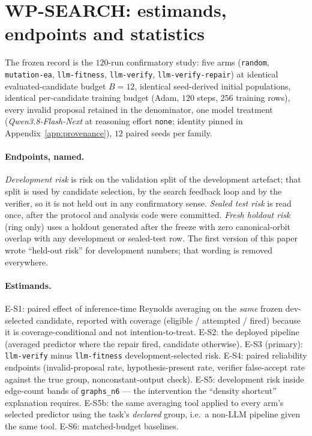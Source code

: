 \documentclass[11pt]{article}
\newcommand{\MODEL}{\textit{Qwen3.8-Flash-Next}}
\begin{document}
\section{WP-SEARCH: estimands, endpoints and statistics}
\label{sec:protocol}
\label{sec:search}

The frozen record is the $120$-run confirmatory study: five arms
(\texttt{random}, \texttt{mutation-ea}, \texttt{llm-fitness}, \texttt{llm-verify},
\texttt{llm-verify-repair}) at identical evaluated-candidate budget $B{=}12$, identical
seed-derived initial populations, identical per-candidate training budget (Adam, $120$
steps, $256$ training rows), every invalid proposal retained in the denominator, one model
treatment (\MODEL{} at reasoning effort \texttt{none}; identity pinned in
Appendix~\ref{app:provenance}), $12$ paired seeds per family.

\paragraph{Endpoints, named.} \emph{Development risk} is risk on the validation split of
the development artefact; that split is used by candidate selection, by the search
feedback loop and by the verifier, so it is not held out in any confirmatory sense.
\emph{Sealed test risk} is read once, after the protocol and analysis code were committed.
\emph{Fresh holdout risk} (ring only) uses a holdout generated after the freeze with zero
canonical-orbit overlap with any development or sealed-test row. The first version of this
paper wrote ``held-out risk'' for development numbers; that wording is removed everywhere.

\paragraph{Estimands.} E-S1: paired effect of inference-time Reynolds averaging on the
\emph{same} frozen dev-selected candidate, reported with coverage (eligible / attempted /
fired) because it is coverage-conditional and not intention-to-treat. E-S2: the deployed
pipeline (averaged predictor where the repair fired, candidate otherwise). E-S3 (primary):
\texttt{llm-verify} minus \texttt{llm-fitness} development-selected risk. E-S4: paired
reliability endpoints (invalid-proposal rate, hypothesis-present rate, verifier
false-accept rate against the true group, nonconstant-output check). E-S5: development
risk inside edge-count bands of \texttt{graphs\_n6} --- the intervention the
``density shortcut'' explanation requires. E-S5b: the same averaging tool applied to every
arm's selected predictor using the task's \emph{declared} group, i.e.\ a non-LLM pipeline
given the same tool. E-S6: matched-budget baselines.
\end{document}
